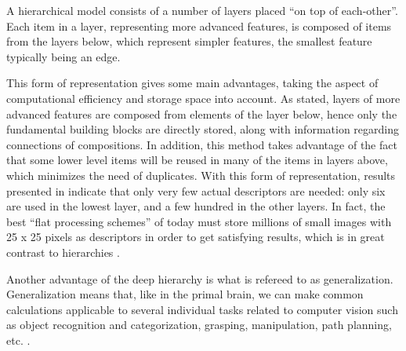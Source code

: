 A hierarchical model consists of a number of layers placed “on top of each-other”.
Each item in a layer, representing more advanced features,
is composed of items from the layers below, which represent simpler features,
the smallest feature typically being an edge.

This form of representation gives some main advantages,
taking the aspect of computational efficiency and storage space into account.
As stated, layers of more advanced features are composed from elements of the layer below,
hence only the fundamental building blocks are directly stored,
along with information regarding connections of compositions.
In addition, this method takes advantage of the fact that some lower level items
will be reused in many of the items in layers above, which minimizes the need of duplicates.
With this form of representation, results presented in \citet{fidler2009learning} indicate that
only very few actual descriptors are needed: only six are used in the lowest layer,
and a few hundred in the other layers.
In fact, the best “flat processing schemes” of today must store millions of small images
with 25 x 25 pixels as descriptors in order to get satisfying results,
which is in great contrast to hierarchies \citep{fidler2009learning}.

Another advantage of the deep hierarchy is what is refereed to as generalization.
Generalization means that, like in the primal brain,
we can make common calculations applicable to several individual tasks
related to computer vision such as object recognition and categorization,
grasping, manipulation, path planning, etc. \citep{kruger2013deep}.
